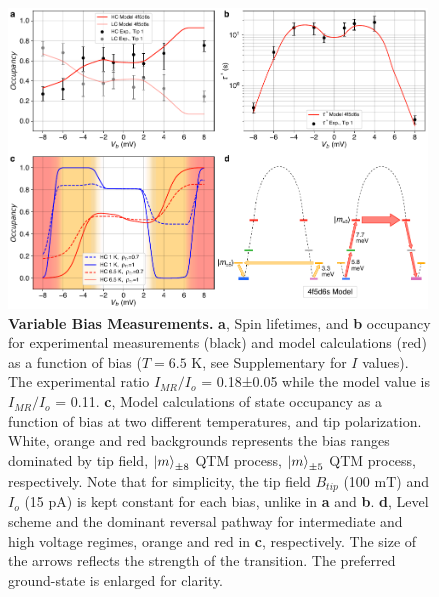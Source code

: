 \documentclass[
reprint,amsmath,amssymb,aps]{revtex4-2}
\begin{document}




\begin{figure}[ht!]
\includegraphics[width=0.99\textwidth]{Fig4_new.pdf}
\caption{\textbf{Variable Bias Measurements.} \textbf{a}, Spin lifetimes, and \textbf{b} occupancy for experimental measurements (black) and model calculations (red) as a function of bias ($T = 6.5$ K, see Supplementary for $I$ values). The experimental ratio $I_{MR}/I_{o}$ = 0.18±0.05 while the model value is $I_{MR}/I_{o}$ = 0.11. \textbf{c}, Model calculations of state occupancy as a function of bias at two different temperatures, and tip polarization. White, orange and red backgrounds represents the bias ranges dominated by tip field, $\ket m_{\pm8}$ QTM process, $\ket m_{\pm5}$ QTM process, respectively. Note that for simplicity, the tip field $B_{tip}$ (100 mT) and $I_o$ (15 pA) is kept constant for each bias, unlike in \textbf{a} and \textbf{b}. \textbf{d}, Level scheme and the dominant reversal pathway for intermediate and high voltage regimes, orange and red in \textbf{c}, respectively. The size of the arrows reflects the strength of the transition. The preferred ground-state is enlarged for clarity.
\label{fig:bias} }
\end{figure}
\end{document}
